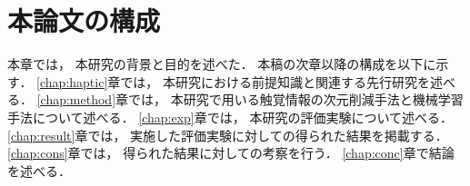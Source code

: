 \section{本論文の構成}
本章では， 本研究の背景と目的を述べた． 本稿の次章以降の構成を以下に示す． \ref{chap:haptic}章では， 本研究における前提知識と関連する先行研究を述べる． \ref{chap:method}章では， 本研究で用いる触覚情報の次元削減手法と機械学習手法について述べる． \ref{chap:exp}章では， 本研究の評価実験について述べる． \ref{chap:result}章では， 実施した評価実験に対しての得られた結果を掲載する． \ref{chap:cons}章では， 得られた結果に対しての考察を行う． \ref{chap:conc}章で結論を述べる．












